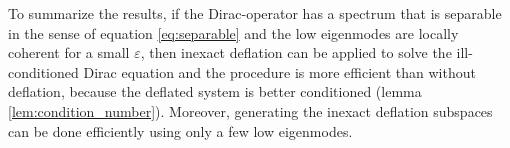 \documentclass{article}
\theoremstyle{plain} %
\theoremstyle{convention} %
\theoremstyle{remark} %
\def\df#1{\textbf{\textit{#1}}}
\numberwithin{equation}{section}
\begin{document}
To summarize the results, if the Dirac-operator has a spectrum that is separable in the sense of equation \eqref{eq:separable} and the low eigenmodes are locally coherent for a small $\varepsilon$, then inexact deflation can be applied to solve the ill-conditioned Dirac equation and the procedure is more efficient than without deflation, because the deflated system is better conditioned (lemma \ref{lem:condition_number}). Moreover, generating the inexact deflation subspaces can be done efficiently using only a few low eigenmodes.

\end{document}
